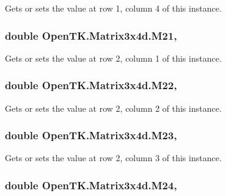 Gets or sets the value at row 1, column 4 of this instance. 

\hypertarget{struct_open_t_k_1_1_matrix3x4d_a2ac0d9448c02b9f7165b5bcbc22d1f89}{
\subsubsection[{M21}]{\setlength{\rightskip}{0pt plus 5cm}double Open\-T\-K.\-Matrix3x4d.\-M21\hspace{0.3cm}{\ttfamily [get]}, {\ttfamily [set]}}}\label{struct_open_t_k_1_1_matrix3x4d_a2ac0d9448c02b9f7165b5bcbc22d1f89}


Gets or sets the value at row 2, column 1 of this instance. 

\hypertarget{struct_open_t_k_1_1_matrix3x4d_afa4dfc45ebcff46af39e7e12b472bb0a}{
\subsubsection[{M22}]{\setlength{\rightskip}{0pt plus 5cm}double Open\-T\-K.\-Matrix3x4d.\-M22\hspace{0.3cm}{\ttfamily [get]}, {\ttfamily [set]}}}\label{struct_open_t_k_1_1_matrix3x4d_afa4dfc45ebcff46af39e7e12b472bb0a}


Gets or sets the value at row 2, column 2 of this instance. 

\hypertarget{struct_open_t_k_1_1_matrix3x4d_a281132f3d09808b92bd08670aae6ad44}{
\subsubsection[{M23}]{\setlength{\rightskip}{0pt plus 5cm}double Open\-T\-K.\-Matrix3x4d.\-M23\hspace{0.3cm}{\ttfamily [get]}, {\ttfamily [set]}}}\label{struct_open_t_k_1_1_matrix3x4d_a281132f3d09808b92bd08670aae6ad44}


Gets or sets the value at row 2, column 3 of this instance. 

\hypertarget{struct_open_t_k_1_1_matrix3x4d_a2a3a0bb1cc85f7a4addb978ef65e8824}{
\subsubsection[{M24}]{\setlength{\rightskip}{0pt plus 5cm}double Open\-T\-K.\-Matrix3x4d.\-M24\hspace{0.3cm}{\ttfamily [get]}, {\ttfamily [set]}}}\label{struct_open_t_k_1_1_matrix3x4d_a2a3a0bb1cc85f7a4addb978ef65e8824}


